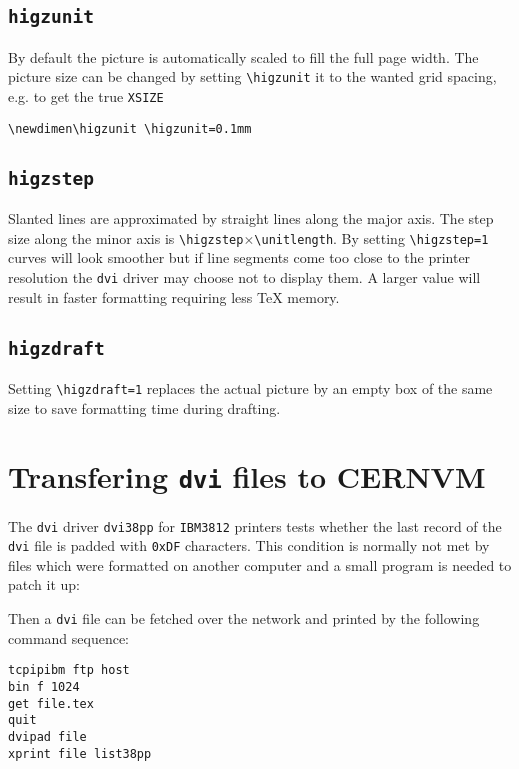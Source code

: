 \subsection{\tt higzunit}

By default the picture is automatically scaled to fill the full page width.
The picture size can be changed by setting \verb'\higzunit'
it to the wanted grid spacing, e.g. to get the true {\tt XSIZE}

\begin{verbatim}
\newdimen\higzunit \higzunit=0.1mm
\end{verbatim}

\subsection{\tt higzstep}

Slanted lines are approximated by straight lines along the major axis.
The step size along the minor axis is 
\verb'\higzstep'$\times$\verb'\unitlength'.
By setting \verb'\higzstep=1' curves will look smoother 
but if line segments come too close to the printer resolution the 
{\tt dvi} driver may choose not to display them.
A larger value will result in faster formatting requiring less \TeX{} memory.

\subsection{\tt higzdraft}

Setting \verb'\higzdraft=1' replaces the actual picture by an empty box 
of the same size to save formatting time during drafting.

\section{Transfering {\tt dvi} files to CERNVM}

The {\tt dvi} driver {\tt dvi38pp} for {\tt IBM3812} printers tests whether
the last record of the {\tt dvi} file is padded with {\tt 0xDF} characters.
This condition is normally not met by files which were formatted on another
computer and a small program is needed to patch it up:

\hbox{}
\hbox{}

Then a {\tt dvi} file can be fetched over the network and printed by the
following command sequence:

\begin{verbatim}
tcpipibm ftp host
bin f 1024
get file.tex
quit
dvipad file
xprint file list38pp
\end{verbatim}

